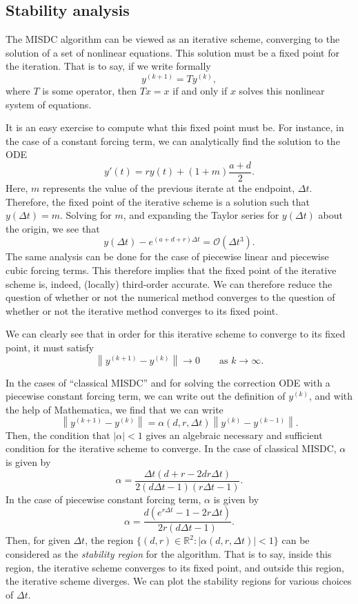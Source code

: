 \documentclass[12pt]{article}
\begin{document}
\subsection{Stability analysis}\label{stability-analysis}
The MISDC algorithm can be viewed as an iterative scheme, converging to the 
solution of a set of nonlinear equations. This solution must be a fixed point 
for the iteration. That is to say, if we write formally
\[
    y^{(k+1)} = Ty^{(k)},
\]
where $T$ is some operator, then $Tx = x$ if and only if $x$ solves this 
nonlinear system of equations.

It is an easy exercise to compute what this fixed point must be. For instance, 
in the case of a constant forcing term, we can analytically find the solution 
to the ODE
\[
    y'(t) = ry(t) + (1+m)\frac{a+d}{2}.
\]
Here, $m$ represents the value of the previous iterate at the endpoint, 
$\Delta t$. Therefore, the fixed point of the iterative scheme is a solution 
such that $y(\Delta t) = m$. Solving for $m$, and expanding the Taylor series 
for $y(\Delta t)$ about the origin, we see that
\[
    y(\Delta t) - e^{(a+d+r)\Delta t} = \mathcal{O}(\Delta t^3).
\]
The same analysis can be done for the case of piecewise linear and piecewise 
cubic forcing terms. This therefore implies that the fixed point of the 
iterative scheme is, indeed, (locally) third-order accurate. We can therefore 
reduce the question of whether or not the numerical method converges to the 
question of whether or not the iterative method converges to its fixed point.

We can clearly see that in order for this 
iterative scheme to converge to its fixed point, it must satisfy
\[
    \left\| y^{(k+1)} - y^{(k)} \right\| \to 0 \qquad \text{as } k \to \infty.
\]

In the cases of ``classical MISDC'' and for solving the correction ODE with 
a piecewise constant forcing term, we can write out the definition of $y^{(k)}$,
and with the help of Mathematica, we find that we can write
\[
    \left\| y^{(k+1)} - y^{(k)} \right\| = 
        \alpha(d, r, \Delta t) \left\| y^{(k)} - y^{(k-1)} \right\|.
\]
Then, the condition that $| \alpha | < 1$ 
gives an algebraic necessary and sufficient condition for the iterative 
scheme to converge.
In the case of classical MISDC, $\alpha$ is given by
\[
    \alpha = \frac{\Delta t(d+r-2dr\Delta t)}{2(d\Delta t -1)(r \Delta t - 1)}.
\]
In the case of piecewise constant forcing term, $\alpha$ is given by
\[
    \alpha = \frac{d(e^{r\Delta t} - 1 - 2r\Delta t)}{2r(d\Delta t - 1)}.
\]
Then, for given $\Delta t$, the region $\{ (d, r) \in \mathbb{R}^2 : 
| \alpha(d, r, \Delta t) | < 1 \}$ can be considered as the \textit{stability 
region} for the algorithm. That is to say, inside this region, the iterative 
scheme converges to its fixed point, and outside this region, the iterative 
scheme diverges. We can plot the stability regions for various choices of 
$\Delta t$.
\end{document}
